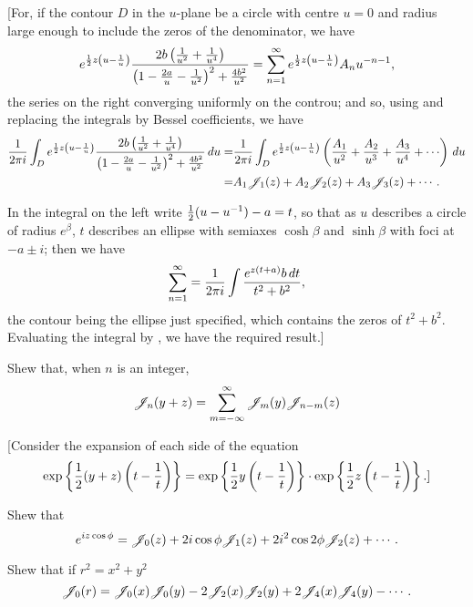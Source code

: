 \documentclass{book}
\begin{document}
[For, if the contour $D$ in the $u$-plane be a circle with centre
$u=0$ and radius large enough to include the zeros of the denominator,
we have
$$
e^{\frac{1}{2} z \left( u - \frac{1}{u} \right)} 
\frac{ 2b \left( \frac{1}{u^2} + \frac{1}{u^4}  \right)  }{ \left( 1 -
    \frac{2a}{u} - \frac{1}{u^2} \right)^2
  + \frac{4 b^2}{u^2}  }
=
\sum_{n=1}^{\infty}
e^{\frac{1}{2} z \left( u - \frac{1}{u} \right)} A_n u^{-n-1},
$$
the series on the right converging uniformly on the controu; and so, 
using  and replacing the integrals by Bessel
coefficients, we have
\begin{align*}
  \frac{1}{2\pi i}
  \int_D
  e^{\half z \theparen{u - \frac{1}{u}}}
  \frac{ 2b \theparen{\frac{1}{u^2} + \frac{1}{u^4} }  }{ \theparen{1 -
      \frac{2a}{u} - \frac{1}{u^2}}^2
    + \frac{4 b^2}{u^2}  }
  \dmeasure u
  =& \frac{1}{2\pi i}
  \int_D
  e^{\half z \theparen{u - \frac{1}{u}}}
  \theparen{ \frac{A_1}{u^2} + \frac{A_2}{u^3} + \frac{A_3}{u^4} +
    \cdots  }
  \dmeasure u \\
  =& A_1 \besJ_1(z) + A_2 \besJ_2(z) + A_3 \besJ_3(z) + \cdots .
\end{align*}

%
%
In the integral on the left write $\frac{1}{2} (u - u^{-1}) - a = t$, so that as
$u$ describes a circle of radius $e^{\beta}$, $t$ describes an ellipse
with 
semiaxes $\cosh\beta$ and $\sinh\beta$ with foci at 
$-a \pm i$; then we have
$$
\sum_{n=1}^{\infty}
=
\frac{1}{2\pi i}
\int
\frac{ e^{z(t+a)}b \, d t  }{ t^2 + b^2  },
$$
the contour being the ellipse just specified, which contains the zeros
of $t^2 + b^2$. Evaluating the integral by 
, we have the required result.]
\begin{wandwexample}
  Shew that, when $n$ is an integer,
  $$
  \mathscr{J}_n(y+z)
  =
  \sum_{m = -\infty}^{\infty} \mathscr{J}_{m}(y) \mathscr{J}_{n-m}(z)
  $$
\end{wandwexample}
[Consider the expansion of each side of the equation
$$
\exp \left\{  \frac{1}{2} (y+z) \left( t - \frac{1}{t} \right)   \right\}
=
\exp \left\{  \frac{1}{2} y \left( t - \frac{1}{t} \right)   \right\}
\cdot
\exp \left\{  \frac{1}{2} z \left( t - \frac{1}{t} \right)   \right\}.]
$$
\begin{wandwexample}
  Shew that 
$$
e^{i z \cos \phi}
= 
\mathscr{J}_0(z)
+ 2 i \cos\phi \mathscr{J}_1(z)
+ 2 i^2 \cos 2\phi \mathscr{J}_2(z)
+ \cdots.
$$
\end{wandwexample}
\begin{wandwexample}
  Shew that if $r^2 = x^2 + y^2$
  $$
  \mathscr{J}_0(r)
  =
  \mathscr{J}_0(x)\mathscr{J}_0(y)
  - 2 \mathscr{J}_2(x) \mathscr{J}_2(y)
  + 2 \mathscr{J}_4(x) \mathscr{J}_4(y)
  - \cdots .
  $$
\end{wandwexample}
\end{document}
